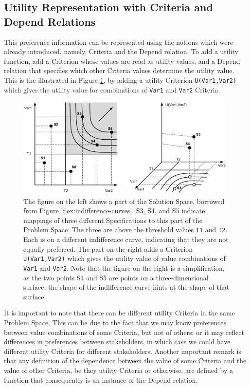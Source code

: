 \documentclass[graybox]{svmult}
\newcommand{\xt}[1]{\texttt{#1}}
\newcommand{\req}[1]{\xt{#1}}
\newcommand{\SolutionSpace}{Solution Space}
\newcommand{\ProblemSpace}{Problem Space}
\newcommand{\Specification}{Specification}
\newcommand{\Criterion}{Criterion}
\newcommand{\Criteria}{Criteria}
\newcommand{\Depend}{Depend}
\begin{document}
%
\subsection{Utility Representation with \Criteria{} and \Depend{} Relations}\label{s:optimal-specifications:utility-representation}
This preference information can be represented using the notions which were already introduced, namely, \Criteria{} and the \Depend{} relation. To add a utility function, add a \Criterion{} whose values are read as utility values, and a \Depend{} relation that specifies which other \Criteria{} values determine the utility value. This is the illustrated in Figure \ref{f:ex:indifference-curves-and-utility}, by adding a utility \Criterion{} \req{U(Var1,Var2)} which gives the utility value for combinations of \req{Var1} and \req{Var2} \Criteria.

\begin{figure}[t]
	\centering
	\includegraphics[width=110mm]{Figures/f-ex-indifference-curves-and-utility}
\caption{The figure on the left shows a part of the \SolutionSpace, borrowed from Figure \ref{f:ex:indifference-curves}. S3, S4, and S5 indicate mappings of three different \Specification s to this part of the \ProblemSpace. The three are above the threshold values \req{T1} and \req{T2}. Each is on a different indifference curve, indicating that they are not equally preferred. The part on the right adds a \Criterion{} \req{U(Var1,Var2)} which gives the utility value of value combinations of \req{Var1} and \req{Var2}. Note that the figure on the right is a simplification, as the two points S4 and S5 are points on a three-dimensional surface; the shape of the indifference curve hints at the shape of that surface.} 
\label{f:ex:indifference-curves-and-utility}
\end{figure}

It is important to note that there can be different utility \Criteria{} in the same \ProblemSpace. This can be due to the fact that we may know preferences between value combinations of some \Criteria, but not of others; or it may reflect differences in preferences between stakeholders, in which case we could have different utility \Criteria{} for different stakeholders. Another important remark is that any definition of the dependence between the value of some \Criteria{} and the value of other \Criteria, be they utility \Criteria{} or otherwise, are defined by a function that consequently is an instance of the \Depend{} relation.
\end{document}
